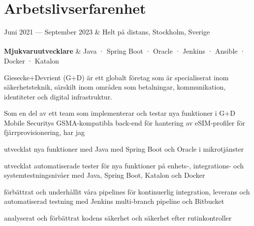 \documentclass{cv-stylish}
\begin{document}
\begin{center}
\begin{adjustwidth}{1cm}{1cm}

\end{adjustwidth}


\section{Arbetslivserfarenhet}

\begin{JobTable}
  Juni 2021 --- September 2023 & \hfill Helt på distans, Stockholm, Sverige \\
   \\[3pt]
  \hspace{5mm} \textbf{Mjukvaruutvecklare}
  & \hfill Java · Spring Boot · Oracle · Jenkins · Ansible · Docker · Katalon \\
\end{JobTable}
\begin{adjustwidth}{0.015\linewidth}{0.015\linewidth}
Giesecke+Devrient (G+D) är ett globalt företag som är specialiserat
inom säkerhetsteknik, särskilt inom områden som betalningar,
kommunikation, identiteter och digital infrastruktur.

Som en del av ett team som implementerar och testar nya funktioner i
G+D Mobile Securitys GSMA-kompatibla back-end för hantering av eSIM-profiler för fjärrprovisionering, har jag

\begin{compactitem}
  \item utvecklat nya funktioner med Java med Spring Boot och Oracle i mikrotjänster
  \item utvecklat automatiserade tester för nya funktioner på enhets-, integrations- och
    systemtestningsnivåer med Java, Spring Boot, Katalon och Docker
  \item förbättrat och underhållit våra pipelines för kontinuerlig integration, leverans och automatiserad testning med Jenkins multi-branch
    pipeline och Bitbucket
  \item analyserat och förbättrat kodens säkerhet och säkerhet efter rutinkontroller
\end{compactitem}
\end{adjustwidth}


\end{center}
\end{document}
